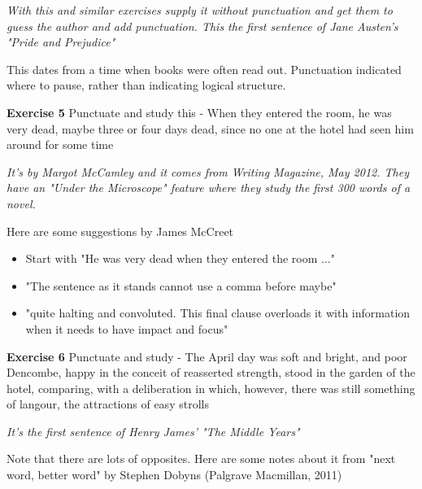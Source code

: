 \documentclass[11pt]{article}
\newenvironment{narrow}[2]{%
 \begin{list}{}{%
  \setlength{\topsep}{0pt}%
  \setlength{\leftmargin}{#1}%
  \setlength{\rightmargin}{#2}%
  \setlength{\listparindent}{\parindent}%
  \setlength{\itemindent}{\parindent}%
  \setlength{\parsep}{\parskip}%
 }%
\item[]}{\end{list}}
\begin{document}
\textit{With this and similar exercises supply it without punctuation and get them to guess the author and add punctuation. This the first sentence of Jane Austen's "Pride and Prejudice"}



This dates from a time when books were often read out. Punctuation indicated where to pause, rather than indicating logical structure.


\begin{narrow}{1.0cm}{1.0cm}
\textbf{Exercise 5}  Punctuate and study this - When they entered the room, he was very dead,
maybe three or four days dead, since no one at the hotel had seen him around for some time
\end{narrow}


\textit{It's by Margot McCamley and it comes from Writing Magazine, May 2012. They have an "Under the Microscope" feature where they study the first 300 words of a novel.}




Here are some suggestions by James McCreet


\begin{itemize}
\item  Start with "He was very dead when they entered the room ..."
\item  "The sentence as it stands cannot use a comma before maybe"
\item  "quite halting and convoluted. This final clause overloads it with information when it needs to have impact and focus"
\end{itemize}

\begin{narrow}{1.0cm}{1.0cm}
\textbf{Exercise 6} Punctuate and study  - 
The April day was soft and bright, and poor Dencombe, happy in the
conceit of reasserted strength, stood in the garden of the hotel,
comparing, with a deliberation in which, however, there was still
something of langour, the attractions of easy strolls
\end{narrow}


\textit{It's the first sentence of Henry James' "The Middle Years"}



Note that there are lots of opposites. Here are some notes about it from "next word, better word" by Stephen Dobyns (Palgrave Macmillan, 2011)
\end{document}
